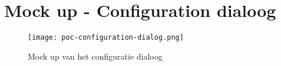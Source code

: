 \section{Mock up - Configuration dialoog}\label{appendix:mockup-configuration-dialog}
\begin{figure}[hbt!]
  \centering
  \texttt{[image: poc-configuration-dialog.png]}
  \caption{Mock up van het configuratie dialoog}
  \label{fig:mockup-configuration-dialog}
\end{figure}

\newpage